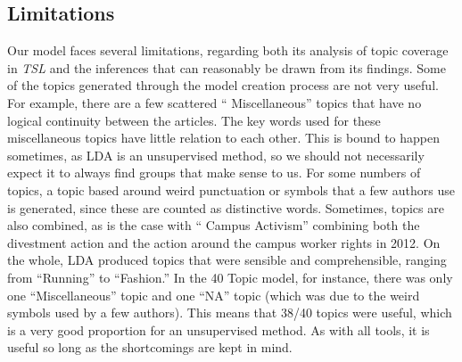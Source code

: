 \documentclass[a4paper]{article}
\begin{document}
\subsection{Limitations}
Our model faces several limitations, regarding both its analysis of topic coverage in \textit{TSL} and the inferences that can reasonably be drawn from its findings. Some of the topics generated through the model creation process are not very useful. For example, there are a few scattered `` Miscellaneous''  topics that have no logical continuity between the articles. The key words used for these miscellaneous topics have little relation to each other. This is bound to happen sometimes, as LDA is an unsupervised method, so we should not necessarily expect it to always find groups that make sense to us. For some numbers of topics, a topic based around weird punctuation or symbols that a few authors use is generated, since these are counted as distinctive words. Sometimes, topics are also combined, as is the case with `` Campus Activism''  combining both the divestment action and the action around the campus worker rights in 2012. On the whole, LDA produced topics that were sensible and comprehensible, ranging from ``Running'' to ``Fashion.'' In the 40 Topic model, for instance, there was only one ``Miscellaneous'' topic and one ``NA'' topic (which was due to the weird symbols used by a few authors). This means that 38/40 topics were useful, which is a very good proportion for an unsupervised method. As with all tools, it is useful so long as the shortcomings are kept in mind.
\end{document}

